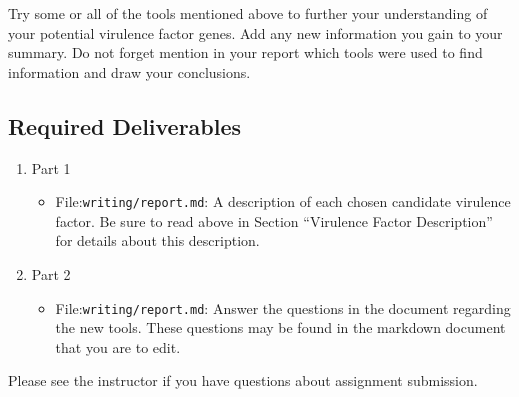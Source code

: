 Try some or all of the tools mentioned above to further your understanding of your potential virulence factor genes.  Add any new information you gain to your summary.  Do not forget mention in your report which tools were used to find information and draw your conclusions.


\vspace*{-.1in}
\subsection*{Required Deliverables}
\vspace*{-.1in}

\color{red}
\begin{enumerate}
	\item Part 1
	\begin{itemize}
	 \item File:{\tt writing/report.md}: A description of each chosen candidate virulence factor. Be sure to read above in Section ``Virulence Factor Description'' for details about this description.
	\end{itemize}

	\item Part 2
	\begin{itemize}
	 \item File:{\tt writing/report.md}: Answer the questions in the document regarding the new tools. These questions may be found in the markdown document that you are to edit. 
	\end{itemize}

\end{enumerate}
\color{black}

\noindent Please see the instructor if you have questions about assignment submission.




